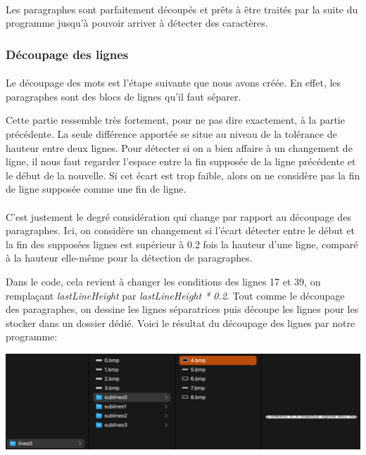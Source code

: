 \documentclass{article}
\begin{document}
	\paragraph{}
	Les paragraphes sont parfaitement découpés et prêts à être traités par la suite du programme jusqu'à pouvoir arriver à détecter des caractères.
	
	\subsubsection{Découpage des lignes}
	\paragraph{}
	Le découpage des mots est l'étape suivante que nous avons créée. En effet, les paragraphes sont des blocs de lignes qu'il faut séparer.
	\par Cette partie ressemble très fortement, pour ne pas dire exactement, à la partie précédente. La seule différence apportée se situe au niveau de la tolérance de hauteur entre deux lignes. Pour détecter si on a bien affaire à un changement de ligne, il nous faut regarder l'espace entre la fin supposée de la ligne précédente et le début de la nouvelle. Si cet écart est trop faible, alors on ne considère pas la fin de ligne supposée comme une fin de ligne.
	
	\paragraph{}
	C'est justement le degré considération qui change par rapport au découpage des paragraphes. Ici, on considère un changement si l'écart détecter entre le début et la fin des supposées lignes est supérieur à 0.2 fois la hauteur d'une ligne, comparé à la hauteur elle-même pour la détection de paragraphes.
	\par Dans le code, cela revient à changer les conditions des lignes 17 et 39, on remplaçant \textit{lastLineHeight} par \textit{lastLineHeight * 0.2}. Tout comme le découpage des paragraphes, on dessine les lignes séparatrices puis découpe les lignes pour les stocker dans un dossier dédié. Voici le résultat du découpage des lignes par notre programme: \\
	
	\begin{center}
		\includegraphics[scale=0.5]{cutLines}
	\end{center}
	
\end{document}
